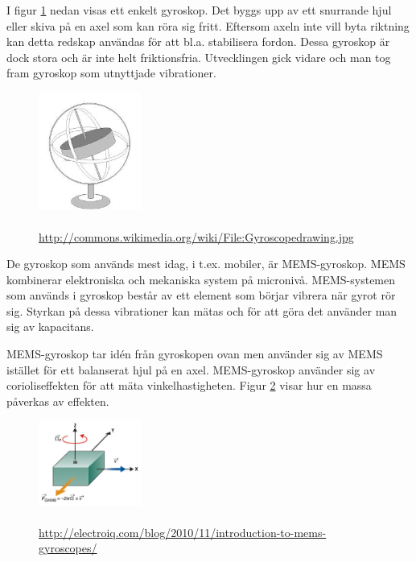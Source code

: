 \documentclass[a4paper,12pt,fleqn]{article}
\begin{document}
I figur \ref{fig:gyro} nedan visas ett enkelt gyroskop. Det byggs upp av ett snurrande hjul eller skiva på en axel som kan röra sig fritt. Eftersom axeln inte vill byta riktning kan detta redskap användas för att bl.a. stabilisera fordon. Dessa gyroskop är dock stora och är inte helt friktionsfria. Utvecklingen gick vidare och man tog fram gyroskop som utnyttjade vibrationer.

\begin{figure}[h]
\begin{center}
\includegraphics[width=0.3\textwidth]
{gyro.jpeg}
\caption{\\\url{http://commons.wikimedia.org/wiki/File:Gyroscopedrawing.jpg}}
\label{fig:gyro}
\end{center}
\end{figure}


De gyroskop som används mest idag, i t.ex. mobiler, är MEMS-gyroskop. MEMS kombinerar elektroniska och mekaniska system på micronivå. MEMS-systemen som används i gyroskop består av ett element som börjar vibrera när gyrot rör sig. Styrkan på dessa vibrationer kan mätas och för att göra det använder man sig av kapacitans.

MEMS-gyroskop tar idén från gyroskopen ovan men använder sig av MEMS istället för ett balanserat hjul på en axel. MEMS-gyroskop använder sig av corioliseffekten för att mäta vinkelhastigheten. Figur \ref{fig:coriolis} visar hur en massa påverkas av effekten.

\begin{figure}[h]
\begin{center}
\caption{\\\url{http://electroiq.com/blog/2010/11/introduction-to-mems-gyroscopes/}}
\label{fig:coriolis}
\includegraphics[width=0.3\textwidth]
{coriolis.png}
\end{center}
\end{figure}
\end{document}
